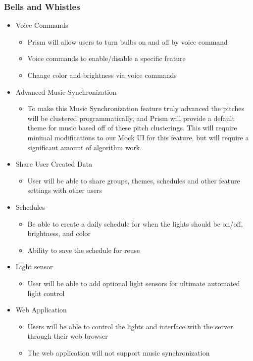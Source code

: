 \documentclass[12pt]{article}
\begin{document}
\subsubsection*{Bells and Whistles}
\begin{itemize}
\item Voice Commands
\begin{itemize}
\item Prism will allow users to turn bulbs on and off by voice command
\item Voice commands to enable/disable a specific feature
\item Change color and brightness via voice commands
\end{itemize}
	
\item Advanced Music Synchronization
\begin{itemize}
\item To make this Music Synchronization feature truly advanced the pitches will be clustered programmatically, and Prism will provide a default theme for music based off of these pitch clusterings. This will require minimal modifications to our Mock UI for this feature, but will require a significant amount of algorithm work.
\end{itemize}

\item Share User Created Data
\begin{itemize}
\item User will be able to share groups, themes, schedules and other feature settings with other users
\end{itemize}

\item Schedules
\begin{itemize}
\item Be able to create a daily schedule for when the lights should be on/off, brightness, and color
\item Ability to save the schedule for reuse
\end{itemize}

\item Light sensor
\begin{itemize}
\item User will be able to add optional light sensors for ultimate automated light control
\end{itemize}

\item Web Application
\begin{itemize}
\item Users will be able to control the lights and interface with the server through their web browser
\item The web application will not support music synchronization
\end{itemize}
\end{itemize}
\clearpage
\end{document}
